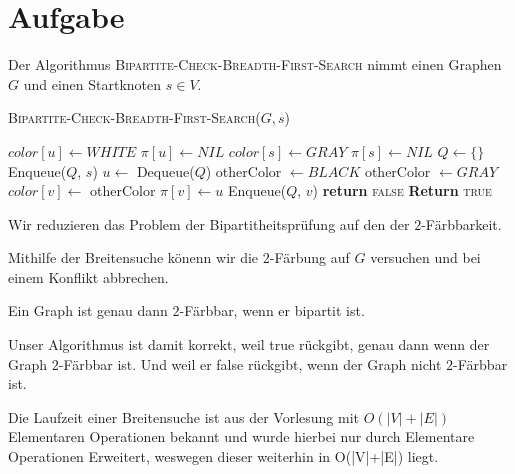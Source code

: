 \documentclass{article}
\newcounter{AufgabenCounter}
\newcounter{TeilaufgabenCounter}
\newenvironment{aufgabe}{\section*{Aufgabe \theAufgabenCounter}\setcounter{TeilaufgabenCounter}{1}}{\stepcounter{AufgabenCounter}}
\begin{document}
\begin{aufgabe}

  Der Algorithmus \textsc{Bipartite-Check-Breadth-First-Search} nimmt einen Graphen $G$ und einen Startknoten $s\in V$.

  \begin{algorithm}[H]
    \caption{\textsc{Bipartite-Check-Breadth-First-Search}($G, s$)}
    \begin{algorithmic}[1]
      \State $color[u]\gets WHITE$
      \State $\pi[u]\gets NIL$
      \EndFor
      \State $color[s]\gets GRAY$
      \State $\pi[s]\gets NIL$
      \State $Q\gets\{\}$
      \State Enqueue($Q$, $s$)
      \State $u\gets$ Dequeue($Q$)
      \State otherColor $\gets BLACK$
      \Else
      \State otherColor $\gets GRAY$
      \EndIf
       
      \State $color[v]\gets $ otherColor
      \State $\pi[v]\gets u$
      \State Enqueue($Q$, $v$)
      \State \textbf{return} \textsc{false}
      \EndIf
      \EndFor
      \EndWhile
      \State \textbf{Return} \textsc{true}
    \end{algorithmic}
  \end{algorithm}

  Wir reduzieren das Problem der Bipartitheitsprüfung auf den der $2$-Färbbarkeit.

  Mithilfe der Breitensuche könenn wir die $2$-Färbung auf $G$ versuchen und bei einem Konflikt
  abbrechen.

  Ein Graph ist genau dann $2$-Färbbar, wenn er bipartit ist.

  Unser Algorithmus ist damit korrekt, weil true rückgibt, genau dann wenn der Graph $2$-Färbbar ist.
  Und weil er false rückgibt, wenn der Graph nicht $2$-Färbbar ist.

  Die Laufzeit einer Breitensuche ist aus der Vorlesung mit $O(|V|+|E|)$ Elementaren Operationen bekannt und wurde hierbei  nur durch Elementare Operationen Erweitert, weswegen dieser weiterhin in O(|V|+|E|) liegt.
\end{aufgabe}
\end{document}
